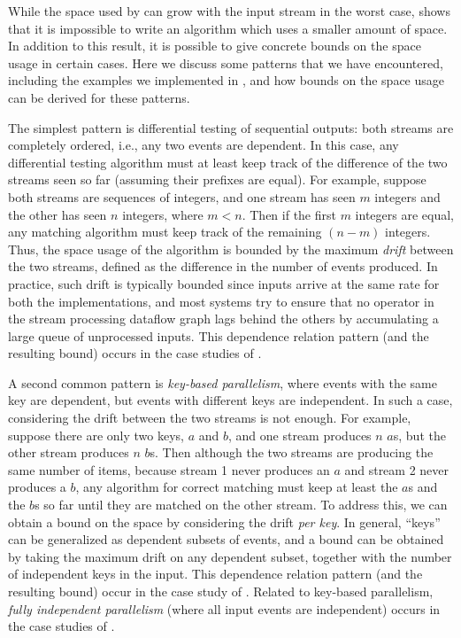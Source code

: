 While the space used by   can grow with the input stream in the worst case,  shows that it is impossible to write an algorithm which uses a smaller amount of space. In addition to this result, it is possible to give concrete bounds on the space usage in certain cases. Here we discuss some patterns that we have encountered, including the examples we implemented in , and how bounds on the space usage can be derived for these patterns.

The simplest pattern is differential testing of sequential outputs: both streams are completely ordered, i.e., any two events are dependent. In this case, any differential testing algorithm must at least keep track of the difference of the two streams seen so far (assuming their prefixes are equal). For example, suppose both streams are sequences of integers, and one stream has seen $m$ integers and the other has seen $n$ integers, where $m < n$. Then if the first $m$ integers are equal, any matching algorithm must keep track of the remaining $(n - m)$ integers. Thus, the space usage of the algorithm is bounded by the maximum \emph{drift} between the two streams, defined as the difference in the number of events produced.
In practice, such drift is typically bounded since inputs arrive at the same rate for both the implementations, and
most systems try to ensure that no operator in the stream processing dataflow graph lags behind the others by accumulating a large queue of unprocessed inputs.
This dependence relation pattern (and the resulting bound) occurs in the case studies of .

A second common pattern is \emph{key-based parallelism}, where events with the same key are dependent, but events with different keys are independent. In such a case, considering the drift between the two streams is not enough. For example, suppose there are only two keys, $a$ and $b$, and one stream produces $n$ $a$s, but the other stream produces $n$ $b$s. Then although the two streams are producing the same number of items, because stream 1 never produces an $a$ and stream 2 never produces a $b$, any algorithm for correct matching must keep at least the $a$s and the $b$s so far until they are matched on the other stream. To address this, we can obtain a bound on the space by considering the drift \emph{per key}. In general, ``keys'' can be generalized as dependent subsets of events, and a bound can be obtained by taking the maximum drift on any dependent subset, together with the number of independent keys in the input. This dependence relation pattern (and the resulting bound) occur in the case study of .
Related to key-based parallelism, \emph{fully independent parallelism} (where all input events are independent) occurs in the case studies of .

